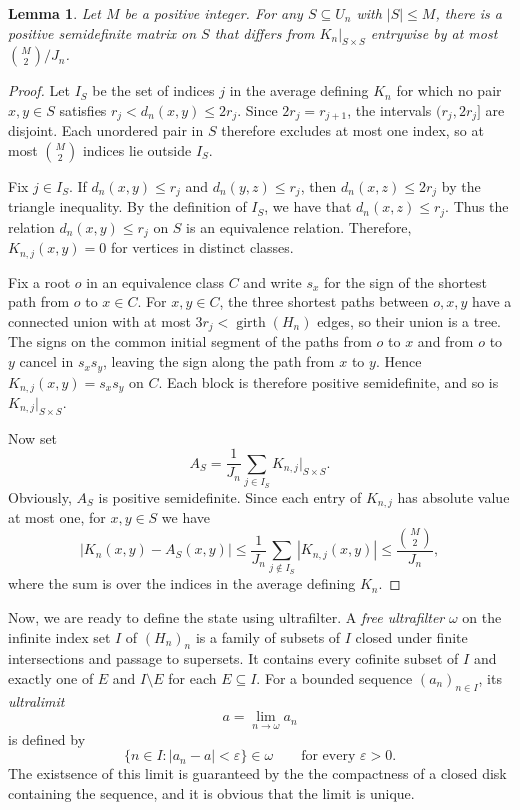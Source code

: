 \documentclass[11pt,a4paper]{article}
\newtheorem{lemma}[theorem]{Lemma}
\theoremstyle{definition}\newtheorem{definition}[theorem]{Definition}
\theoremstyle{remark}\newtheorem{remark}[theorem]{Remark}
\DeclareMathOperator{\girth}{girth}
\begin{document}
\begin{lemma}\label{lem:small-kernel}
Let $M$ be a positive integer. For any $S\subseteq U_n$ with
$|S|\le M$, there is a positive semidefinite matrix on $S$ that
differs from $K_n|_{S\times S}$ entrywise by at most
$\binom{M}{2}/J_n$.
\end{lemma}
\begin{proof}
Let $I_S$ be the set of indices $j$ in the average defining $K_n$
for which no pair $x,y\in S$ satisfies
$r_j<d_n(x,y)\le 2r_j$. Since $2r_j=r_{j+1}$, the intervals
$(r_j,2r_j]$ are disjoint. Each unordered pair in $S$ therefore
excludes at most one index, so at most $\binom{M}{2}$ indices
lie outside $I_S$.

Fix $j\in I_S$. If $d_n(x,y)\le r_j$ and $d_n(y,z)\le r_j$,
then $d_n(x,z)\le 2r_j$ by the triangle inequality. By the definition
of $I_S$, we have that $d_n(x,z)\le r_j$. Thus the relation
$d_n(x,y)\le r_j$ on $S$ is an equivalence relation. Therefore,
$K_{n,j}(x,y)=0$ for vertices in distinct classes.

Fix a root $o$ in an equivalence class $C$ and write $s_x$ for the
sign of the shortest path from $o$ to $x\in C$. For $x,y\in C$,
the three shortest paths between $o,x,y$ have a connected union
with at most $3r_j<\girth(H_n)$ edges, so their union is a tree.
The signs on the common initial segment of the paths from $o$
to $x$ and from $o$ to $y$ cancel in $s_xs_y$, leaving the sign
along the path from $x$ to $y$. Hence $K_{n,j}(x,y)=s_xs_y$ on $C$.
Each block is therefore positive semidefinite, and so is
$K_{n,j}|_{S\times S}$.

Now set
$$
A_S=\frac1{J_n}\sum_{j\in I_S}K_{n,j}|_{S\times S}.
$$
Obviously, $A_S$ is positive semidefinite. Since each entry of
$K_{n,j}$ has absolute value at most one, for $x,y\in S$ we have
$$
|K_n(x,y)-A_S(x,y)|
\le \frac1{J_n}\sum_{j\notin I_S}|K_{n,j}(x,y)|
\le \frac{\binom{M}{2}}{J_n},
$$
where the sum is over the indices in the average defining $K_n$.
\end{proof}

Now, we are ready to define the state using ultrafilter. A \emph{free ultrafilter} $\omega$ on the infinite index set $I$ of
$(H_n)_n$ is a family of subsets of $I$ closed under finite
intersections and passage to supersets. It contains every cofinite
subset of $I$ and exactly one of $E$ and $I\setminus E$ for each
$E\subseteq I$. For a bounded sequence
$(a_n)_{n\in I}$, its \emph{ultralimit} 
$$a=\lim_{n\to\omega}a_n$$
is defined by
$$
\{n\in I:|a_n-a|<\varepsilon\}\in\omega
\qquad\text{for every }\varepsilon>0.
$$
The existsence of this limit is guaranteed by the the compactness of a closed disk containing the sequence, 
and it is obvious that the limit is unique. 
\end{document}
